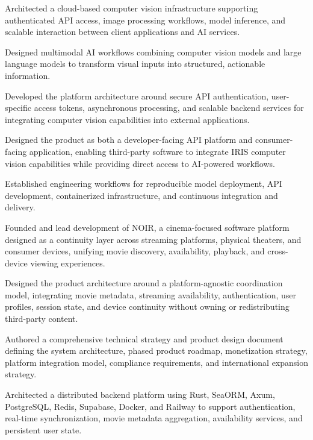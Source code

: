 \documentclass{../../../Styles/MS-Style}
\begin{document}
\begin{Form}
\begin{listBlock}
		\generalItem
		Architected a cloud-based computer vision infrastructure supporting
		authenticated API access, image processing workflows, model inference,
		and scalable interaction between client applications and AI services.

		\generalItem
		Designed multimodal AI workflows combining computer vision models
		and large language models to transform visual inputs into structured,
		actionable information.

		\generalItem
		Developed the platform architecture around secure API authentication,
		user-specific access tokens, asynchronous processing, and scalable
		backend services for integrating computer vision capabilities into
		external applications.

		\generalItem
		Designed the product as both a developer-facing API platform and
		consumer-facing application, enabling third-party software to integrate
		IRIS computer vision capabilities while providing direct access to
		AI-powered workflows.

		\generalItem
		Established engineering workflows for reproducible model deployment,
		API development, containerized infrastructure, and continuous integration
		and delivery.

	\end{listBlock}


	\begin{listBlock}

		\generalItem
		Founded and lead development of NOIR, a cinema-focused software platform
		designed as a continuity layer across streaming platforms, physical theaters,
		and consumer devices, unifying movie discovery, availability, playback,
		and cross-device viewing experiences.

		\generalItem
		Designed the product architecture around a platform-agnostic coordination model,
		integrating movie metadata, streaming availability, authentication, user profiles,
		session state, and device continuity without owning or redistributing third-party content.

		\generalItem
		Authored a comprehensive technical strategy and product design document
		defining the system architecture, phased product roadmap, monetization strategy,
		platform integration model, compliance requirements, and international expansion strategy.

		\generalItem
		Architected a distributed backend platform using Rust, SeaORM, Axum, PostgreSQL,
		Redis, Supabase, Docker, and Railway to support authentication, real-time
		synchronization, movie metadata aggregation, availability services, and persistent user state.


\end{listBlock}
\end{Form}
\end{document}

